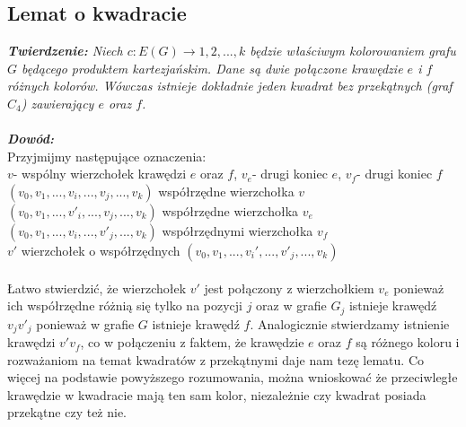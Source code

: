 \documentclass[12pt,a4paper,titlepage]{article}
\begin{document}
\subsection{Lemat o kwadracie}
\textit{\textbf{Twierdzenie:} Niech $c: E(G) \rightarrow {1,2,...,k}$ będzie właściwym kolorowaniem grafu $G$ będącego produktem kartezjańskim. Dane są dwie połączone krawędzie $e$ i $f$ różnych kolorów. Wówczas istnieje dokładnie jeden kwadrat bez przekątnych (graf $C_4$) zawierający $e$ oraz $f$.}\\
\\
\textit{\textbf{Dowód:}}\\
Przyjmijmy następujące oznaczenia:\\
$v$- wspólny wierzchołek krawędzi $e$ oraz $f$, $v_e$- drugi koniec $e$, $v_f$- drugi koniec $f$\\
$(v_0 , v_1, ... ,v_i, ..., v_j,...,v_k )$ współrzędne wierzchołka $v$\\
$(v_0 , v_1, ... ,v'_i, ..., v_j,...,v_k )$ współrzędne wierzchołka $v_e$\\
$(v_0 , v_1, ... ,v_i, ..., v'_j,...,v_k )$ współrzędnymi wierzchołka $v_f$\\
$v'$ wierzchołek o współrzędnych $(v_0 , v_1, ... ,v_i', ..., v'_j,...,v_k )$\\ 
\\
Łatwo stwierdzić, że wierzchołek $v'$ jest połączony z wierzchołkiem $v_e$ ponieważ ich współrzędne różnią się tylko na pozycji $j$ oraz w grafie $G_j$ istnieje krawędź $v_j v'_j$ ponieważ w grafie $G$ istnieje krawędź $f$. Analogicznie stwierdzamy istnienie krawędzi $v'v_f$, co w połączeniu z faktem, że krawędzie $e$ oraz $f$ są różnego koloru i rozważaniom na temat kwadratów z przekątnymi daje nam tezę lematu. Co więcej na podstawie powyższego rozumowania, można wnioskować że przeciwległe krawędzie w kwadracie mają ten sam kolor, niezależnie czy kwadrat posiada przekątne czy też nie.\\
\end{document}
